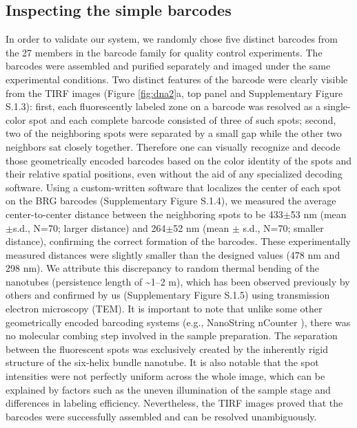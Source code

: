 \subsection{Inspecting the simple barcodes}
In order to validate our system, we randomly chose five distinct barcodes from the
27 members in the barcode family for quality control experiments. The barcodes were 
assembled and purified separately and imaged under the same experimental conditions. 
Two distinct features of the barcode were clearly visible from the TIRF images (Figure 
\ref{fig:dna2}a, top panel and Supplementary Figure S.1.3): first, each fluorescently labeled zone on a barcode was 
resolved as a single-color spot and each complete barcode consisted of three of such 
spots; second, two of the neighboring spots were separated by a small gap while the other 
two neighbors sat closely together. Therefore one can visually recognize and decode 
those geometrically encoded barcodes based on the color identity of the spots and their 
relative spatial positions, even without the aid of any specialized decoding software. 
Using a custom-written software that localizes the center of each spot on the BRG 
barcodes (Supplementary Figure 
S.1.4), we measured the average center-to-center distance between the 
neighboring spots to be 433$\pm$53 nm (mean$\pm$s.d., N=70; larger distance) and 264$\pm$52 nm 
(mean $\pm$ s.d., N=70; smaller distance), confirming the correct formation of the barcodes. 
These experimentally measured distances were slightly smaller than the designed values 
(478 nm and 298 nm). We attribute this discrepancy to random thermal bending of the 
nanotubes (persistence length of \textasciitilde1–2 \textmu m), which has been observed previously by 
others \citep{rothemund_folding_2006, han_folding_2010} and confirmed by us (Supplementary Figure S.1.5) using transmission electron microscopy 
(TEM). It is important to note that unlike some other geometrically encoded barcoding 
systems (e.g., NanoString nCounter \citep{geiss_direct_2008}), there was no molecular combing step involved in
the sample preparation. The separation between the fluorescent spots was exclusively 
created by the inherently rigid structure of the six-helix bundle nanotube. It is also 
notable that the spot intensities were not perfectly uniform across the whole image, which 
can be explained by factors such as the uneven illumination of the sample stage and 
differences in labeling efficiency. Nevertheless, the TIRF images proved that the 
barcodes were successfully assembled and can be resolved unambiguously.


